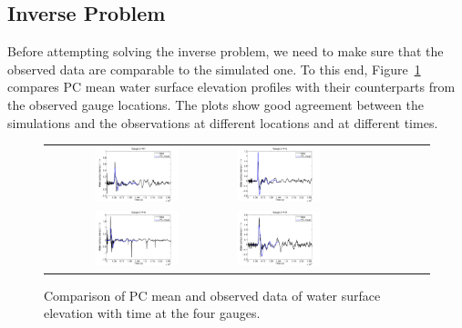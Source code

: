 \subsection{Inverse Problem} 
\label{sec:inverse}

Before attempting solving the inverse problem,
we need to make sure that the observed data are
comparable to the simulated one.
To this end, Figure~\ref{fig:compare}
compares PC mean water surface elevation profiles
with their counterparts from the observed gauge locations.
The plots show good agreement between the simulations and the observations at different
locations and at different times. 
%
\begin{figure}[h]
\begin{tabular}{clc}
%        
\includegraphics[width=0.475\textwidth]{./figures/compare1.pdf} &
\includegraphics[width=0.475\textwidth]{./figures/compare2.pdf} \\
\includegraphics[width=0.475\textwidth]{./figures/compare3.pdf} &
\includegraphics[width=0.475\textwidth]{./figures/compare4.pdf}
\end{tabular}
\caption{Comparison of PC mean 
and observed data of water surface elevation with time at the four gauges.}
\label{fig:compare}
\end{figure}     

